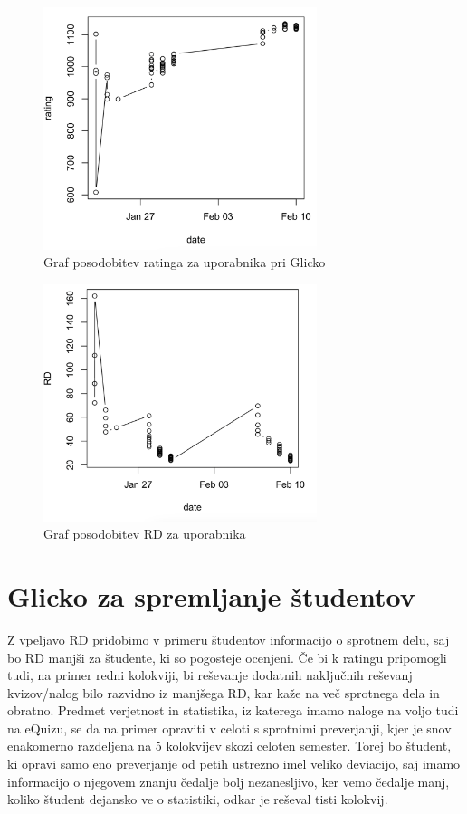 \documentclass{IEEEtran}
\begin{document}
\begin{figure}[h!]
    \includegraphics[width=8cm]{UserExampleSGlicko}
    \caption{Graf posodobitev ratinga za uporabnika pri Glicko}%
    \label{fig:uexsg}%
\end{figure}
\begin{figure}[h!]
    \includegraphics[width=8cm]{UserExampleSRD}
    \caption{Graf posodobitev RD za uporabnika}%
    \label{fig:uexsgrd}%
\end{figure}

\newpage
\section{Glicko za spremljanje študentov}
\label{sec:funkcionalnosti}
Z vpeljavo $\mathrm{RD}$ pridobimo v primeru študentov informacijo o sprotnem delu, saj bo $\mathrm{RD}$ manjši za študente, ki so pogosteje ocenjeni. Če bi k ratingu pripomogli tudi, na primer redni kolokviji, bi reševanje dodatnih  naključnih reševanj kvizov/nalog bilo razvidno iz manjšega $\mathrm{RD}$, kar kaže na več sprotnega dela in obratno. Predmet verjetnost in statistika, iz katerega imamo naloge na voljo tudi na eQuizu, se da na primer opraviti v celoti s sprotnimi preverjanji, kjer je snov enakomerno razdeljena na 5 kolokvijev skozi celoten semester. Torej bo študent, ki opravi samo eno preverjanje od petih ustrezno imel veliko deviacijo, saj imamo informacijo o njegovem znanju čedalje bolj nezanesljivo, ker vemo čedalje manj, koliko študent dejansko ve o statistiki, odkar je reševal tisti kolokvij.
\end{document}
